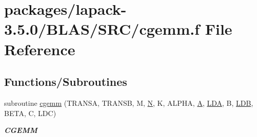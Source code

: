 \hypertarget{lapack-3_85_80_2BLAS_2SRC_2cgemm_8f}{}\section{packages/lapack-\/3.5.0/\+B\+L\+A\+S/\+S\+R\+C/cgemm.f File Reference}
\label{lapack-3_85_80_2BLAS_2SRC_2cgemm_8f}
\subsection*{Functions/\+Subroutines}
\begin{DoxyCompactItemize}
\item 
subroutine \hyperlink{group__complex__blas__level3_gac4e11e8e8a4b0c802d2229b08da341f6}{cgemm} (T\+R\+A\+N\+S\+A, T\+R\+A\+N\+S\+B, M, \hyperlink{polmisc_8c_a0240ac851181b84ac374872dc5434ee4}{N}, K, A\+L\+P\+H\+A, \hyperlink{classA}{A}, \hyperlink{example__user_8c_ae946da542ce0db94dced19b2ecefd1aa}{L\+D\+A}, B, \hyperlink{example__user_8c_a50e90a7104df172b5a89a06c47fcca04}{L\+D\+B}, B\+E\+T\+A, C, L\+D\+C)
\begin{DoxyCompactList}\small\item\em {\bfseries C\+G\+E\+M\+M} \end{DoxyCompactList}\end{DoxyCompactItemize}
